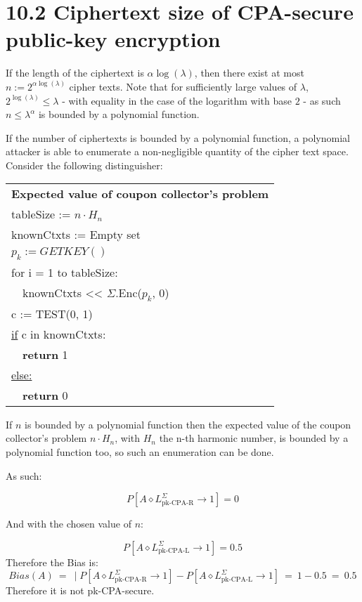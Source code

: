 \documentclass{report}
\begin{document}
	\section*{10.2 Ciphertext size of CPA-secure public-key encryption}
		If the length of the ciphertext is $\alpha \log(\lambda)$, then there exist at most $n := 2^{\alpha \log(\lambda)}$ cipher texts. Note that for sufficiently large values of $\lambda$, $2^{\log(\lambda)} \leq \lambda$ - with equality in the case of the logarithm with base $2$ -  as such $n \leq \lambda^\alpha$ is bounded by a polynomial function.

		If the number of ciphertexts is bounded by a polynomial function, a polynomial attacker is able to enumerate a non-negligible quantity of the cipher text space. Consider the following distinguisher:
		
		\begin{center}
			\begin{tabular}{|l|}
				\hline
				\textbf{Expected value of coupon collector's problem} \\
				tableSize := $n \cdot H_n$ \\
				knownCtxts := Empty set \\
				$p_k := GETKEY()$ \\
				for i = 1 to tableSize: \\
		  		\ \ knownCtxts << $\Sigma$.Enc($p_k$, 0) \\
				c := TEST(0, 1) \\
				\underline{if} c in knownCtxts: \\
		  		\ \ \textbf{return} 1 \\
				\underline{else:} \\
		  		\ \ \textbf{return} 0 \\
		  		\hline
			\end{tabular}
		\end{center}

		If $n$ is bounded by a polynomial function then the expected value of the coupon collector's problem $n \cdot H_n$, with $H_n$ the n-th harmonic number, is bounded by a polynomial function too, so such an enumeration can be done.

		As such:

		\[
			P\left[A \diamond L^\Sigma_{\text{pk-CPA-R}} \rightarrow 1\right] = 0
		\]

		And with the chosen value of $n$:

		\[
			P\left[A \diamond L^\Sigma_{\text{pk-CPA-L}} \rightarrow 1\right] = 0.5
		\]
		Therefore the Bias is:
		\[
			Bias(A) \ = \ \mid P\left[A \diamond L^\Sigma_{\text{pk-CPA-R}} \rightarrow 1\right] - P\left[A \diamond L^\Sigma_{\text{pk-CPA-L}} \rightarrow 1\right] \ = \ 1 - 0.5 \ = \ 0.5
		\]
		Therefore it is not pk-CPA-secure.
\end{document}
